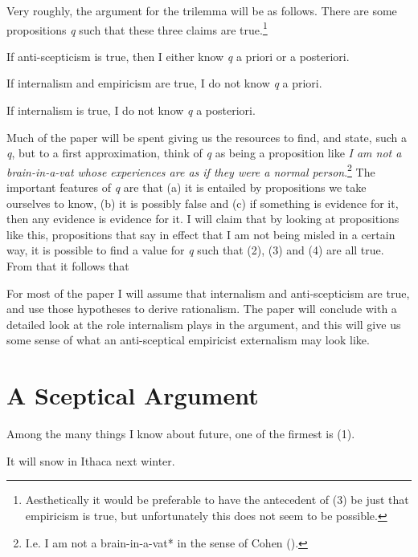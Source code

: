 \documentclass[
  11pt,
  letterpaper,
  DIV=11,
  numbers=noendperiod,
  twoside]{scrartcl}
\providecommand{\tightlist}{%
  \setlength{\itemsep}{0pt}\setlength{\parskip}{0pt}}
\begin{document}
Very roughly, the argument for the trilemma will be as follows. There
are some propositions \emph{q} such that these three claims are
true.\footnote{Aesthetically it would be preferable to have the
  antecedent of (3) be just that empiricism is true, but unfortunately
  this does not seem to be possible.}

\begin{description}
\tightlist
\item[(2)]
If anti-scepticism is true, then I either know \emph{q} a priori or a
posteriori.
\item[(3)]
If internalism and empiricism are true, I do not know \emph{q} a priori.
\item[(4)]
If internalism is true, I do not know \emph{q} a posteriori.
\end{description}

Much of the paper will be spent giving us the resources to find, and
state, such a \emph{q}, but to a first approximation, think of \emph{q}
as being a proposition like \emph{I am not a brain-in-a-vat whose
experiences are as if they were a normal person}.\footnote{I.e. I am not
  a brain-in-a-vat* in the sense of Cohen
  ().} The important features of \emph{q}
are that (a) it is entailed by propositions we take ourselves to know,
(b) it is possibly false and (c) if something is evidence for it, then
any evidence is evidence for it. I will claim that by looking at
propositions like this, propositions that say in effect that I am not
being misled in a certain way, it is possible to find a value for
\emph{q} such that (2), (3) and (4) are all true. From that it follows
that

For most of the paper I will assume that internalism and anti-scepticism
are true, and use those hypotheses to derive rationalism. The paper will
conclude with a detailed look at the role internalism plays in the
argument, and this will give us some sense of what an anti-sceptical
empiricist externalism may look like.

\section{A Sceptical Argument}\label{a-sceptical-argument}

Among the many things I know about future, one of the firmest is (1).

\begin{description}
\tightlist
\item[(2)]
It will snow in Ithaca next winter.
\end{description}
\end{document}
